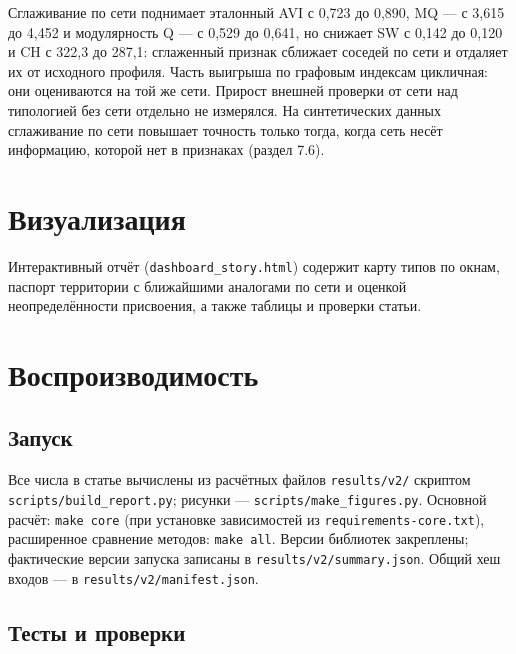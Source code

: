 \documentclass[11pt,a4paper]{article}
\begin{document}
\endgroup

Сглаживание по сети поднимает эталонный AVI с 0,723 до 0,890, MQ --- с 3,615 до 4,452 и модулярность Q --- с 0,529 до 0,641, но снижает SW с 0,142 до 0,120 и CH с 322,3 до 287,1: сглаженный признак сближает соседей по сети и отдаляет их от исходного профиля. Часть выигрыша по графовым индексам цикличная: они оцениваются на той же сети. Прирост внешней проверки от сети над типологией без сети отдельно не измерялся. На синтетических данных сглаживание по сети повышает точность только тогда, когда сеть несёт информацию, которой нет в признаках (раздел 7.6).

\section{Визуализация}\label{ux432ux438ux437ux443ux430ux43bux438ux437ux430ux446ux438ux44f}

Интерактивный отчёт (\texttt{dashboard\_\allowbreak{}story.\allowbreak{}html}) содержит карту типов по окнам, паспорт территории с ближайшими аналогами по сети и оценкой неопределённости присвоения, а также таблицы и проверки статьи.

\section{Воспроизводимость}\label{ux432ux43eux441ux43fux440ux43eux438ux437ux432ux43eux434ux438ux43cux43eux441ux442ux44c}

\subsection{Запуск}\label{ux437ux430ux43fux443ux441ux43a}

Все числа в статье вычислены из расчётных файлов \texttt{results/\allowbreak{}v2/\allowbreak{}} скриптом \texttt{scripts/\allowbreak{}build\_\allowbreak{}report.\allowbreak{}py}; рисунки --- \texttt{scripts/\allowbreak{}make\_\allowbreak{}figures.\allowbreak{}py}. Основной расчёт: \texttt{make core} (при установке зависимостей из \texttt{requirements-\allowbreak{}core.\allowbreak{}txt}), расширенное сравнение методов: \texttt{make all}. Версии библиотек закреплены; фактические версии запуска записаны в \texttt{results/\allowbreak{}v2/\allowbreak{}summary.\allowbreak{}json}. Общий хеш входов --- в \texttt{results/\allowbreak{}v2/\allowbreak{}manifest.\allowbreak{}json}.

\subsection{Тесты и проверки}\label{ux442ux435ux441ux442ux44b-ux438-ux43fux440ux43eux432ux435ux440ux43aux438}
\end{document}
